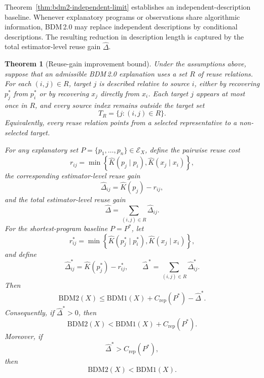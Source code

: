 \documentclass{article}
\newtheorem{theorem}{Theorem}
\begin{document}
Theorem~\ref{thm:bdm2-independent-limit} establishes an independent-description baseline. Whenever explanatory programs or observations share algorithmic information, BDM\,2.0 may replace independent descriptions by conditional descriptions. The resulting reduction in description length is captured by the total estimator-level reuse gain \(\hat{\Delta}\).


\begin{theorem}[Reuse-gain improvement bound]
\label{thm:bdm2-reuse-improvement}
Under the assumptions above, suppose that an admissible BDM\,2.0 explanation uses a set \(R\) of reuse relations. For each \((i,j)\in R\), target \(j\) is described relative to source \(i\), either by recovering \(p_j^*\) from \(p_i^*\) or by recovering \(x_j\) directly from \(x_i\). Each target \(j\) appears at most once in \(R\), and every source index remains outside the target set
\[
T_R
=
\{j:(i,j)\in R\}.
\]
Equivalently, every reuse relation points from a selected representative to a non-selected target.

For any explanatory set \(P=\{p_1,\ldots,p_n\}\in\mathcal E_X\), define the pairwise reuse cost
\[
r_{ij}
=
\min
\left\{
\hat K(p_j\mid p_i),
\hat K(x_j\mid x_i)
\right\},
\]
the corresponding estimator-level reuse gain
\[
\hat{\Delta}_{ij}
=
\hat K(p_j)-r_{ij},
\]
and the total estimator-level reuse gain
\[
\hat{\Delta}
=
\sum_{(i,j)\in R}
\hat{\Delta}_{ij}.
\]
For the shortest-program baseline \(P=P^*\), let
\[
r_{ij}^*
=
\min
\left\{
\hat K(p_j^*\mid p_i^*),
\hat K(x_j\mid x_i)
\right\},
\]
and define
\[
\hat{\Delta}_{ij}^*
=
\hat K(p_j^*)-r_{ij}^*,
\qquad
\hat{\Delta}^*
=
\sum_{(i,j)\in R}
\hat{\Delta}_{ij}^*.
\]
Then
\[
\mathrm{BDM2}(X)
\leq
\mathrm{BDM1}(X)
+
C_{\mathrm{rep}}(P^*)
-
\hat{\Delta}^*.
\]
Consequently, if \(\hat{\Delta}^*>0\), then
\[
\mathrm{BDM2}(X)
<
\mathrm{BDM1}(X)
+
C_{\mathrm{rep}}(P^*).
\]
Moreover, if
\[
\hat{\Delta}^*
>
C_{\mathrm{rep}}(P^*),
\]
then
\[
\mathrm{BDM2}(X)
<
\mathrm{BDM1}(X).
\]
\end{theorem}
\end{document}
